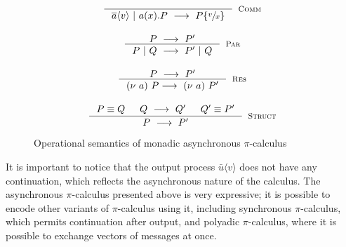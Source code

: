 \documentclass[12pt,twoside]{report}
\begin{document}
\begin{figure}[h!]
    \centering
    \begin{equation*}
    \centering
    \begin{array}{c}
    \inference{}{\overline{a}\langle v \rangle\ |\ a(x).P\ \longrightarrow\ P\{\sfrac{v}{x}\}}[\textsc{Comm}]\\[20pt]
    \inference{P\ \longrightarrow\ P'}{P\ |\ Q\ \longrightarrow\ P'\ |\ Q}[\textsc{Par}]\\[20pt]
    \inference{P\ \longrightarrow\ P'}{(\nu\ a)\ P \longrightarrow\ (\nu\ a)\ P'}[\textsc{Res}]\\[20pt]
    \inference{
        P \equiv Q 
        & Q\ \longrightarrow\ Q' 
        & Q' \equiv P'
    }{P\ \longrightarrow\ P'}[\textsc{Struct}]
    \end{array}
    \end{equation*}
    \caption{Operational semantics of monadic asynchronous $\pi$-calculus}
    \label{picalc_op_sem}
\end{figure}{}

It is important to notice that the output process $\bar{u} \langle v \rangle$ does not have any continuation, which reflects the asynchronous nature of the calculus. The asynchronous $\pi$-calculus presented above is very expressive; it is possible to encode other variants of $\pi$-calculus using it, including synchronous $\pi$-calculus, which permits continuation after output, and polyadic $\pi$-calculus, where it is possible to exchange vectors of messages at once. 


         
\end{document}
